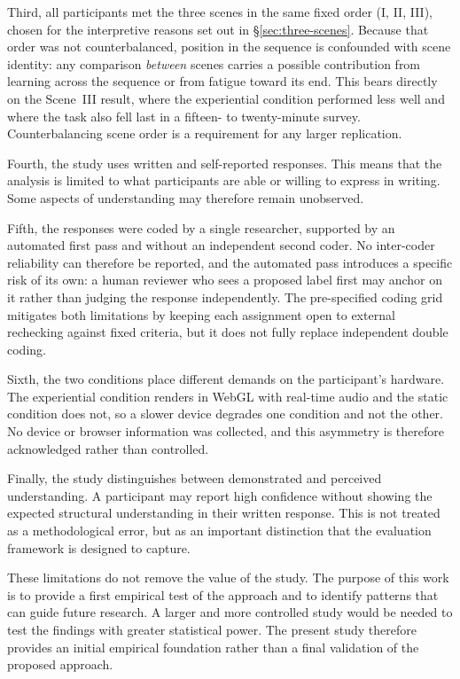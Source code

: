 Third, all participants met the three scenes in the same fixed order (I, II, III), chosen for the interpretive reasons set out in \S\ref{sec:three-scenes}. Because that order was not counterbalanced, position in the sequence is confounded with scene identity: any comparison \emph{between} scenes carries a possible contribution from learning across the sequence or from fatigue toward its end. This bears directly on the Scene~III result, where the experiential condition performed less well and where the task also fell last in a fifteen- to twenty-minute survey. Counterbalancing scene order is a requirement for any larger replication.

Fourth, the study uses written and self-reported responses. This means that the analysis is limited to what participants are able or willing to express in writing. Some aspects of understanding may therefore remain unobserved.

Fifth, the responses were coded by a single researcher, supported by an automated first pass and without an independent second coder. No inter-coder reliability can therefore be reported, and the automated pass introduces a specific risk of its own: a human reviewer who sees a proposed label first may anchor on it rather than judging the response independently. The pre-specified coding grid mitigates both limitations by keeping each assignment open to external rechecking against fixed criteria, but it does not fully replace independent double coding.

Sixth, the two conditions place different demands on the participant's hardware. The experiential condition renders in WebGL with real-time audio and the static condition does not, so a slower device degrades one condition and not the other. No device or browser information was collected, and this asymmetry is therefore acknowledged rather than controlled.

Finally, the study distinguishes between demonstrated and perceived understanding. A participant may report high confidence without showing the expected structural understanding in their written response. This is not treated as a methodological error, but as an important distinction that the evaluation framework is designed to capture.

These limitations do not remove the value of the study. The purpose of this work is to provide a first empirical test of the approach and to identify patterns that can guide future research. A larger and more controlled study would be needed to test the findings with greater statistical power. The present study therefore provides an initial empirical foundation rather than a final validation of the proposed approach.

